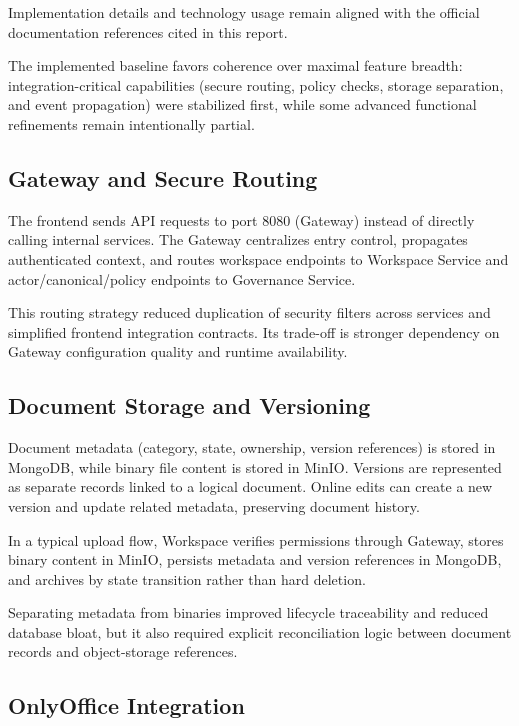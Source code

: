 Implementation details and technology usage remain aligned with the official
documentation references cited in this report.

The implemented baseline favors coherence over maximal feature breadth:
integration-critical capabilities (secure routing, policy checks, storage
separation, and event propagation) were stabilized first, while some advanced
functional refinements remain intentionally partial.

\subsection{Gateway and Secure Routing}

The frontend sends API requests to port 8080 (Gateway) instead of directly
calling internal services. The Gateway centralizes entry control, propagates
authenticated context, and routes workspace endpoints to Workspace Service and
actor/canonical/policy endpoints to Governance Service.

This routing strategy reduced duplication of security filters across services
and simplified frontend integration contracts. Its trade-off is stronger
dependency on Gateway configuration quality and runtime availability.

\subsection{Document Storage and Versioning}

Document metadata (category, state, ownership, version references) is stored in
MongoDB, while binary file content is stored in MinIO. Versions are represented
as separate records linked to a logical document. Online edits can create a new
version and update related metadata, preserving document history.

In a typical upload flow, Workspace verifies permissions through Gateway,
stores binary content in MinIO, persists metadata and version references in
MongoDB, and archives by state transition rather than hard deletion.

Separating metadata from binaries improved lifecycle traceability and reduced
database bloat, but it also required explicit reconciliation logic between
document records and object-storage references.

\subsection{OnlyOffice Integration}

